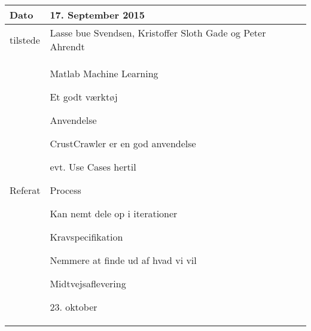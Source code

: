 \begin{center}
	\begin{tabular}{| l | p{10cm} |}
		\hline
		Dato		& 17. September 2015\\ \hline
		tilstede 	& Lasse bue Svendsen, Kristoffer Sloth Gade og Peter Ahrendt\\ \hline
		Referat		& \vspace{-5mm}\begin{myEnumerate}
			\item Matlab Machine Learning
			\begin{myItemize}				
				\item Et godt værktøj
			\end{myItemize}
			\item Anvendelse
			\begin{myItemize}
				\item CrustCrawler er en god anvendelse
				\item evt. Use Cases hertil
			\end{myItemize}
			\item Process
			\begin{myItemize}
				\item Kan nemt dele op i iterationer
			\end{myItemize}
			\item Kravspecifikation
			\begin{myItemize}
				\item Nemmere at finde ud af hvad vi vil
			\end{myItemize}
			\item Midtvejsaflevering
			\begin{myItemize}
				\item 23. oktober
			\end{myItemize}
		\end{myEnumerate}\\	
		\hline
	\end{tabular}
\end{center}

